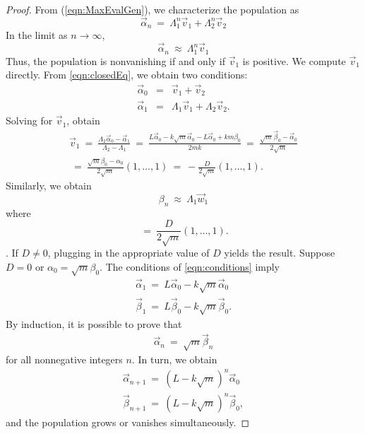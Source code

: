 \documentclass[11pt,reqno]{amsart}
\numberwithin{equation}{section}
\theoremstyle{plain}
\begin{document}
\begin{proof}
    From (\ref{eqn:MaxEvalGen}), we characterize the population as
    \begin{equation}\label{eqn:closedEq}
    \vec \alpha_n \ =\ \Lambda_1^{n}  \vec v_1+ \Lambda_2^{n}\vec v_2
    \end{equation}
    In the limit as $n \rightarrow \infty$, 
    \begin{equation}
    \vec \alpha_n \ \approx\ \Lambda_1^{n}  \vec v_1
    \end{equation}
    Thus, the population is nonvanishing if and only if $\vec v_1$ 
    is positive. We compute $\vec v_1$ directly. From \ref{eqn:closedEq}, we obtain two conditions: 
    \begin{eqnarray}
        \vec \alpha_0 & = & \vec v_1 + \vec v_2 \nonumber \\ 
        \vec \alpha_1 & = & \Lambda_1 \vec v_1 + \Lambda_2 \vec v_2.
    \end{eqnarray}
    Solving for $\vec v_1$, obtain 
    \begin{equation}
        \begin{split}
        \vec v_1 \ = \ \frac {\Lambda_2 \vec\alpha_0 - \vec\alpha_1} {\Lambda_2 - \Lambda_1}
        \ = \ 
        \frac {L\vec \alpha_0 - k\sqrt m \vec \alpha_0 - L \vec \alpha_0 + km\beta_0} {2mk} 
        \ = \ 
        \frac {\sqrt{m}\vec\beta_0 -  \vec \alpha_0} {2\sqrt m} \\ 
        \ = \ \frac {\sqrt m \beta_0 - \alpha_0} {2 \sqrt m} (1, \dots, 1) 
        \ = \ -\frac D{2\sqrt m} (1, \dots, 1).
        \end{split}
    \end{equation}
    Similarly, we obtain 
    \begin{equation}
        \beta_n \ \approx \ \Lambda_1 \vec w_1  
    \end{equation}
    where 
    \begin{equation}
        \ = \ \frac D {2\sqrt m }(1, \dots, 1).
    \end{equation}
    . If $D \neq 0$, plugging in the appropriate value of $D$ yields 
    the result. Suppose $D = 0$ or $\alpha_0 = \sqrt m \beta _0$. The 
    conditions of \ref{eqn:conditions} imply
    \begin{eqnarray}
        \vec \alpha_1  \ = \ L \vec \alpha_0 - k \sqrt m \vec \alpha_0 \nonumber \\ 
        \vec \beta_1 \ = \ L \vec \beta_0 - k \sqrt m \vec \beta_0.
    \end{eqnarray} 
    By induction, it is possible to prove that 
    \begin{eqnarray}
        \vec \alpha_n \ = \ \sqrt m \vec \beta_n
    \end{eqnarray}
    for all nonnegative integers $n$. In turn, we obtain 
    \begin{eqnarray}
        \vec \alpha_{n + 1} \ = \ 
        \left(
            L - k \sqrt m
        \right)^n \vec \alpha_0 \nonumber
        \\ 
        \vec \beta_{n + 1} \ = \ 
        \left(
            L - k \sqrt m
        \right)^n \vec \beta_0,
    \end{eqnarray}
    and the population grows or vanishes simultaneously. 
\end{proof}
\end{document}
